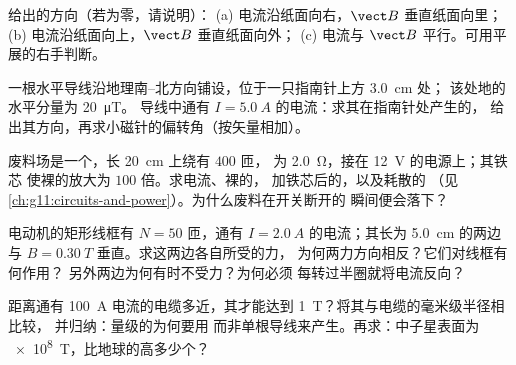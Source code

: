 \begin{exercise}[$\star\star$]\label{exo:g11:magnetic-fields:11}
给出的方向（若为零，请说明）：
(a) 电流沿纸面向右，$\vect B$ 垂直纸面向里；
(b) 电流沿纸面向上，$\vect B$ 垂直纸面向外；
(c) 电流与 $\vect B$ 平行。可用平展的右手判断。
\end{exercise}

\begin{exercise}[$\star\star\star$]\label{exo:g11:magnetic-fields:12}
一根水平导线沿地理南–北方向铺设，位于一只指南针上方 \qty{3.0}{cm} 处；
该处地的水平分量为 \qty{20}{\micro T}。
导线中通有 $I = \qty{5.0}{A}$ 的电流：求其在指南针处产生的，
给出其方向，再求小磁针的偏转角（按矢量相加）。
\end{exercise}

\begin{exercise}[$\star\star\star$]\label{exo:g11:magnetic-fields:13}
废料场是一个，长 \qty{20}{cm} 上绕有 $400$ 匝，
为 \qty{2.0}{\ohm}，接在 \qty{12}{V} 的电源上；其铁芯
使裸的放大为 $100$ 倍。求电流、裸的，
加铁芯后的，以及耗散的
（见\cref{ch:g11:circuits-and-power}）。为什么废料在开关断开的
瞬间便会落下？
\end{exercise}

\begin{exercise}[$\star\star\star$]\label{exo:g11:magnetic-fields:14}
电动机的矩形线框有 $N = 50$ 匝，通有
$I = \qty{2.0}{A}$ 的电流；其长为 \qty{5.0}{cm} 的两边
与 $B = \qty{0.30}{T}$ 垂直。求这两边各自所受的力，
为何两力方向相反？它们对线框有何作用？
另外两边为何有时不受力？为何必须
每转过半圈就将电流反向？
\end{exercise}

\begin{exercise}[$\star\star\star$]\label{exo:g11:magnetic-fields:15}
距离通有 \qty{100}{A} 电流的电缆多近，其才能达到
\qty{1}{T}？将其与电缆的毫米级半径相比较，
并归纳：量级的为何要用
而非单根导线来产生。再求：中子星表面为
\qty{e8}{T}，比地球的高多少个？
\end{exercise}

